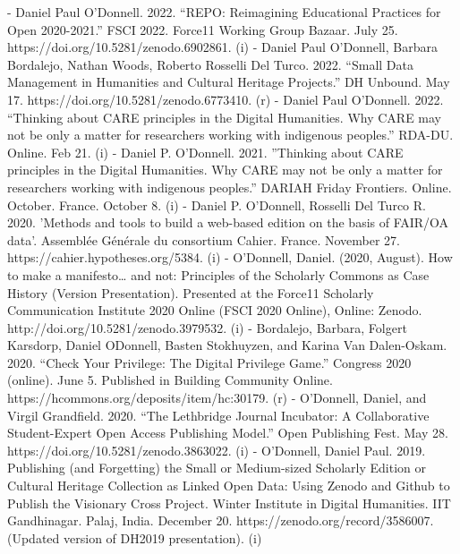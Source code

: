 - Daniel Paul O’Donnell. 2022. “REPO: Reimagining Educational Practices for Open 2020-2021.” FSCI 2022. Force11 Working Group Bazaar. July 25. https:/\allowbreak{}/\allowbreak{}doi.org/\allowbreak{}10.5281/\allowbreak{}zenodo.6902861. (i)
- Daniel Paul O’Donnell, Barbara Bordalejo, Nathan Woods, Roberto Rosselli Del Turco. 2022. “Small Data Management in Humanities and Cultural Heritage Projects.” DH Unbound. May 17. https:/\allowbreak{}/\allowbreak{}doi.org/\allowbreak{}10.5281/\allowbreak{}zenodo.6773410. (r)
- Daniel Paul O’Donnell. 2022. “Thinking about CARE principles in the Digital Humanities.  Why CARE may not be only a matter for researchers working with indigenous peoples.” RDA-DU. Online. Feb 21. (i)
- Daniel P. O'Donnell. 2021. ''Thinking about CARE principles in the Digital Humanities. Why CARE may not be only a matter for researchers working with indigenous peoples.” DARIAH Friday Frontiers. Online. October. France. October 8. (i)
- Daniel P. O'Donnell, Rosselli Del Turco R. 2020. 'Methods and tools to build a web-based edition on the basis of FAIR/\allowbreak{}OA data'. Assemblée Générale du consortium Cahier. France. November 27. https:/\allowbreak{}/\allowbreak{}cahier.hypotheses.org/\allowbreak{}5384. (i)
- O'Donnell, Daniel. (2020, August). How to make a manifesto… and not: Principles of the Scholarly Commons as Case History (Version Presentation). Presented at the Force11 Scholarly Communication Institute 2020 Online (FSCI 2020 Online), Online: Zenodo. http:/\allowbreak{}/\allowbreak{}doi.org/\allowbreak{}10.5281/\allowbreak{}zenodo.3979532. (i)
- Bordalejo, Barbara, Folgert Karsdorp, Daniel ODonnell, Basten Stokhuyzen, and Karina Van Dalen-Oskam. 2020. “Check Your Privilege: The Digital Privilege Game.” Congress 2020 (online). June 5. Published in Building Community Online. https:/\allowbreak{}/\allowbreak{}hcommons.org/\allowbreak{}deposits/\allowbreak{}item/\allowbreak{}hc:30179. (r)
- O’Donnell, Daniel, and Virgil Grandfield. 2020. “The Lethbridge Journal Incubator: A Collaborative Student-Expert Open Access Publishing Model.” Open Publishing Fest. May 28. https:/\allowbreak{}/\allowbreak{}doi.org/\allowbreak{}10.5281/\allowbreak{}zenodo.3863022. (i)
- O’Donnell, Daniel Paul. 2019. Publishing (and Forgetting) the Small or Medium-sized Scholarly Edition or Cultural Heritage Collection as Linked Open Data: Using Zenodo and Github to Publish the Visionary Cross Project. Winter Institute in Digital Humanities. IIT Gandhinagar. Palaj, India. December 20. https:/\allowbreak{}/\allowbreak{}zenodo.org/\allowbreak{}record/\allowbreak{}3586007. (Updated version of DH2019 presentation). (i)
